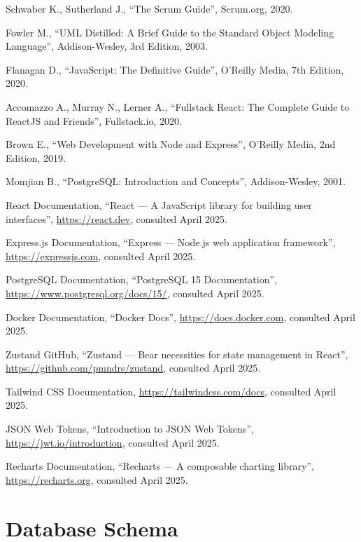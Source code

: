 \documentclass[12pt,a4paper,oneside]{report}
\begin{document}
\begin{enumerate}[label={[\arabic*]}]
    \item Schwaber K., Sutherland J., ``The Scrum Guide'', Scrum.org, 2020.
    \item Fowler M., ``UML Distilled: A Brief Guide to the Standard Object Modeling Language'', Addison-Wesley, 3rd Edition, 2003.
    \item Flanagan D., ``JavaScript: The Definitive Guide'', O'Reilly Media, 7th Edition, 2020.
    \item Accomazzo A., Murray N., Lerner A., ``Fullstack React: The Complete Guide to ReactJS and Friends'', Fullstack.io, 2020.
    \item Brown E., ``Web Development with Node and Express'', O'Reilly Media, 2nd Edition, 2019.
    \item Momjian B., ``PostgreSQL: Introduction and Concepts'', Addison-Wesley, 2001.
    \item React Documentation, ``React --- A JavaScript library for building user interfaces'', \url{https://react.dev}, consulted April 2025.
    \item Express.js Documentation, ``Express --- Node.js web application framework'', \url{https://expressjs.com}, consulted April 2025.
    \item PostgreSQL Documentation, ``PostgreSQL 15 Documentation'', \url{https://www.postgresql.org/docs/15/}, consulted April 2025.
    \item Docker Documentation, ``Docker Docs'', \url{https://docs.docker.com}, consulted April 2025.
    \item Zustand GitHub, ``Zustand --- Bear necessities for state management in React'', \url{https://github.com/pmndrs/zustand}, consulted April 2025.
    \item Tailwind CSS Documentation, \url{https://tailwindcss.com/docs}, consulted April 2025.
    \item JSON Web Tokens, ``Introduction to JSON Web Tokens'', \url{https://jwt.io/introduction}, consulted April 2025.
    \item Recharts Documentation, ``Recharts --- A composable charting library'', \url{https://recharts.org}, consulted April 2025.
\end{enumerate}


\appendix
\chapter{Database Schema}
\end{document}
